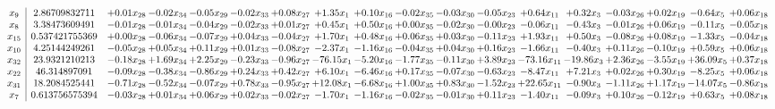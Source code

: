 \documentclass[9pt]{article}
\begin{document}
 \[\begin{array}{c| c c@{\hskip 2pt} c@{\hskip 2pt} c@{\hskip 2pt} c@{\hskip 2pt} c@{\hskip 2pt} c@{\hskip 2pt} c@{\hskip 2pt} c@{\hskip 2pt} c@{\hskip 2pt} c@{\hskip 2pt} c@{\hskip 2pt} c@{\hskip 2pt} c@{\hskip 2pt} c@{\hskip 2pt} c@{\hskip 2pt} c@{\hskip 2pt} }
 x_{9}   &  2.86709832711 & +  0.01 x_{28} & -0.02 x_{34} & -0.05 x_{29} & -0.02 x_{33} & +  0.08 x_{27} & +  1.35 x_{1} & +  0.10 x_{16} & -0.02 x_{35} & -0.03 x_{30} & -0.05 x_{23} & +  0.64 x_{11} & +  0.32 x_{3} & -0.03 x_{26} & +  0.02 x_{19} & -0.64 x_{5} & +  0.06 x_{18}\\
 x_{8}   &  3.38473609491 & -0.01 x_{28} & -0.01 x_{34} & -0.04 x_{29} & -0.02 x_{33} & +  0.01 x_{27} & +  0.45 x_{1} & +  0.50 x_{16} & +  0.00 x_{35} & -0.02 x_{30} & -0.00 x_{23} & -0.06 x_{11} & -0.43 x_{3} & -0.01 x_{26} & +  0.06 x_{19} & -0.11 x_{5} & -0.05 x_{18}\\
 x_{15}   &  0.537421755369 & +  0.00 x_{28} & -0.06 x_{34} & -0.07 x_{29} & +  0.04 x_{33} & -0.04 x_{27} & +  1.70 x_{1} & +  0.48 x_{16} & +  0.06 x_{35} & +  0.03 x_{30} & -0.11 x_{23} & +  1.93 x_{11} & +  0.50 x_{3} & -0.08 x_{26} & +  0.08 x_{19} & -1.33 x_{5} & -0.04 x_{18}\\
 x_{10}   &  4.25144249261 & -0.05 x_{28} & +  0.05 x_{34} & +  0.11 x_{29} & +  0.01 x_{33} & -0.08 x_{27} & -2.37 x_{1} & -1.16 x_{16} & -0.04 x_{35} & +  0.04 x_{30} & +  0.16 x_{23} & -1.66 x_{11} & -0.40 x_{3} & +  0.11 x_{26} & -0.10 x_{19} & +  0.59 x_{5} & +  0.06 x_{18}\\
 x_{32}   &  23.9321210213 & -0.18 x_{28} & +  1.69 x_{34} & +  2.25 x_{29} & -0.23 x_{33} & -0.96 x_{27} & -76.15 x_{1} & -5.20 x_{16} & -1.77 x_{35} & -0.11 x_{30} & +  3.89 x_{23} & -73.16 x_{11} & -19.86 x_{3} & +  2.36 x_{26} & -3.55 x_{19} & + 36.09 x_{5} & +  0.37 x_{18}\\
 x_{22}   &  46.314897091 & -0.09 x_{28} & -0.38 x_{34} & -0.86 x_{29} & +  0.24 x_{33} & +  0.42 x_{27} & +  6.10 x_{1} & -6.46 x_{16} & +  0.17 x_{35} & -0.07 x_{30} & -0.63 x_{23} & -8.47 x_{11} & +  7.21 x_{3} & +  0.02 x_{26} & +  0.30 x_{19} & -8.25 x_{5} & +  0.06 x_{18}\\
 x_{31}   &  18.2084525441 & -0.71 x_{28} & -0.52 x_{34} & -0.07 x_{29} & +  0.78 x_{33} & -0.95 x_{27} & + 12.08 x_{1} & -6.68 x_{16} & +  1.00 x_{35} & +  0.83 x_{30} & -1.52 x_{23} & + 22.65 x_{11} & -0.90 x_{3} & -1.11 x_{26} & +  1.17 x_{19} & -14.07 x_{5} & -0.86 x_{18}\\
 x_{7}   &  0.613756575394 & -0.03 x_{28} & +  0.01 x_{34} & +  0.06 x_{29} & +  0.02 x_{33} & -0.02 x_{27} & -1.70 x_{1} & -1.16 x_{16} & -0.02 x_{35} & -0.01 x_{30} & +  0.11 x_{23} & -1.40 x_{11} & -0.09 x_{3} & +  0.10 x_{26} & -0.12 x_{19} & +  0.63 x_{5} & +  0.08 x_{18}\\

\end{array}\]
\end{document}
